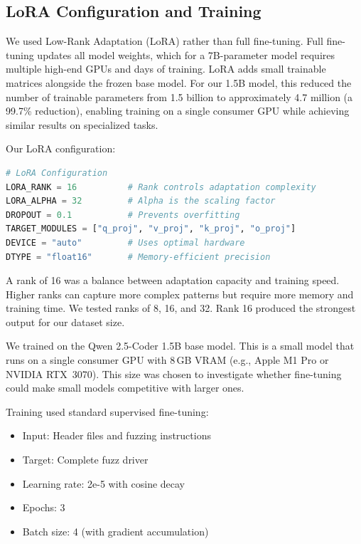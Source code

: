 \subsection{LoRA Configuration and Training}

We used Low-Rank Adaptation (LoRA) \cite{Hu2021} rather than full fine-tuning. Full fine-tuning updates all model weights, which for a 7B-parameter model requires multiple high-end GPUs and days of training. LoRA adds small trainable matrices alongside the frozen base model. For our 1.5B model, this reduced the number of trainable parameters from 1.5 billion to approximately 4.7 million (a 99.7\% reduction), enabling training on a single consumer GPU while achieving similar results on specialized tasks.

Our LoRA configuration:

\begin{lstlisting}[language=Python, caption={LoRA Configuration Parameters}]
# LoRA Configuration
LORA_RANK = 16          # Rank controls adaptation complexity
LORA_ALPHA = 32         # Alpha is the scaling factor
DROPOUT = 0.1           # Prevents overfitting
TARGET_MODULES = ["q_proj", "v_proj", "k_proj", "o_proj"]
DEVICE = "auto"         # Uses optimal hardware
DTYPE = "float16"       # Memory-efficient precision
\end{lstlisting}

A rank of 16 was a balance between adaptation capacity and training speed. Higher ranks can capture more complex patterns but require more memory and training time. We tested ranks of 8, 16, and 32. Rank 16 produced the strongest output for our dataset size.

We trained on the Qwen 2.5-Coder 1.5B base model. This is a small model that runs on a single consumer GPU with 8\,GB VRAM (e.g., Apple M1 Pro or NVIDIA RTX~3070). This size was chosen to investigate whether fine-tuning could make small models competitive with larger ones.

Training used standard supervised fine-tuning:
\begin{itemize}
    \item Input: Header files and fuzzing instructions
    \item Target: Complete fuzz driver
    \item Learning rate: 2e-5 with cosine decay
    \item Epochs: 3
    \item Batch size: 4 (with gradient accumulation)
\end{itemize}


